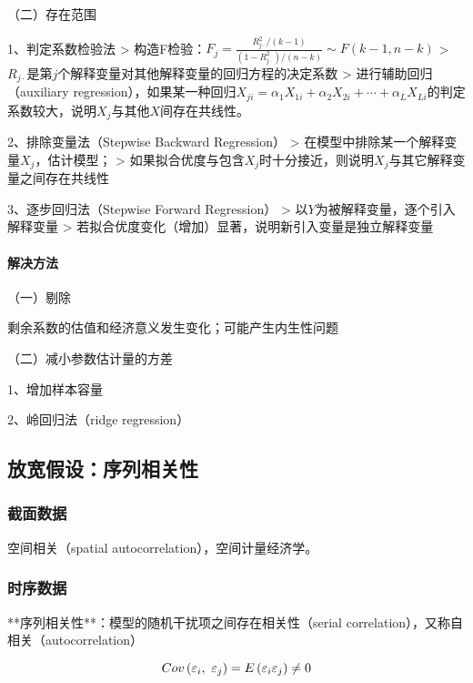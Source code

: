 \documentclass[12pt]{book}
\begin{document}
（二）存在范围

1、判定系数检验法
> 构造F检验：$F_j=\frac{R_{j\cdot}^{2}/(k-1)}{(1-R_{j\cdot}^{2})/(n-k)}\sim F(k-1,n-k)$  
> $R_{j\cdot}$是第$j$个解释变量对其他解释变量的回归方程的决定系数  
> 进行辅助回归（auxiliary regression），如果某一种回归$X_{ji}=\alpha_{1}X_{1i}+\alpha_{2}X_{2i}+\cdots+\alpha_{L}X_{Li}$的判定系数较大，说明$X_j$与其他$X$间存在共线性。

2、排除变量法（Stepwise Backward Regression）
> 在模型中排除某一个解释变量$X_j$，估计模型；  
> 如果拟合优度与包含$X_j$时十分接近，则说明$X_j$与其它解释变量之间存在共线性

3、逐步回归法（Stepwise Forward Regression）
> 以$Y$为被解释变量，逐个引入解释变量  
> 若拟合优度变化（增加）显著，说明新引入变量是独立解释变量

\paragraph{解决方法}

（一）剔除

剩余系数的估值和经济意义发生变化；可能产生内生性问题

（二）减小参数估计量的方差

1、增加样本容量

2、岭回归法（ridge regression）





\subsection{放宽假设：序列相关性}

\subsubsection{截面数据}
空间相关（spatial autocorrelation），空间计量经济学。




\subsubsection{时序数据}







**序列相关性**：模型的随机干扰项之间存在相关性（serial correlation），又称自相关（autocorrelation）

$$
Cov\left(\varepsilon_i,\ \varepsilon_j\right)=E\left(\varepsilon_i\varepsilon_j\right)\neq0\\
$$
\end{document}
